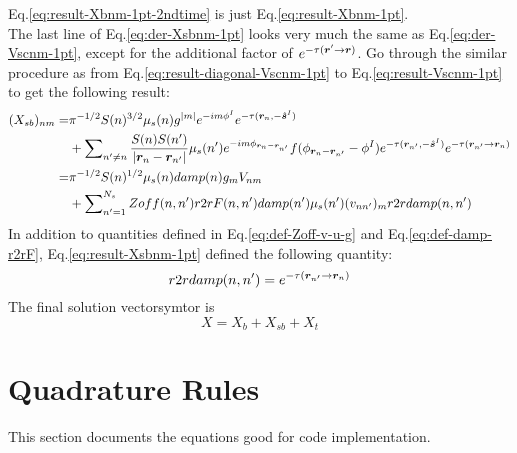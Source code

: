 \documentclass [10pt,letterpaper]{article}
\newcommand{\unitvectorsym}[1]{\hat{\vectorsym{#1}}}
\begin{document}
Eq.\eqref{eq:result-Xbnm-1pt-2ndtime} is just Eq.\eqref{eq:result-Xbnm-1pt}.
\\
The last line of Eq.\eqref{eq:der-Xsbnm-1pt} looks very much the same as Eq.\eqref{eq:der-Vscnm-1pt}, except for the additional factor of $e^{-\tau(\vectorsym{r}^\prime \to \vectorsym{r})}$. 
Go through the similar procedure as from Eq.\eqref{eq:result-diagonal-Vscnm-1pt} to Eq.\eqref{eq:result-Vscnm-1pt} to get the following result:
\begin{equation} \label{eq:result-Xsbnm-1pt}
	\begin{split} 
		(X_{sb})_{n m}
		=&
		\pi^{-1/2}
		S(n)^{3/2}
		\mu_s(n)
		g^{\lvert m \rvert}
		e^{-i m \phi^I }
		e^{-\tau(\vectorsym{r}_n,-\unitvectorsym{s}^I)} 
		\\
		&+
		\sum \nolimits_{n^\prime \neq n}
		\frac
		{S(n)S(n^\prime)}
		{\lvert \vectorsym{r}_n - \vectorsym{r}_{n^\prime} \rvert} 
		\mu_s(n^\prime)
		e^{-i m \phi_{\vectorsym{r}_n - \vectorsym{r}_{n^\prime}}}
		f(\phi_{\vectorsym{r}_n - \vectorsym{r}_{n^\prime}}-\phi^I)
		e^{-\tau(\vectorsym{r}_{n^\prime},-\unitvectorsym{s}^I)} 
		e^{-\tau(\vectorsym{r}_{n^\prime} \to \vectorsym{r}_n)} 
		\\
		=&
		\pi^{-1/2}
		S(n)^{1/2}
		\mu_s(n)
		damp(n)
		g_m
		V_{n m}
		\\
		&+
		\sum \nolimits_{n^\prime=1}^{N_s}
		Zoff(n,n^\prime)
		r2rF(n,n^\prime)
		damp(n^\prime)
		\mu_s(n^\prime)
		(v_{n n^\prime})_m
		r2rdamp(n,n^\prime)
	\end{split}
\end{equation}
In addition to quantities defined in Eq.\eqref{eq:def-Zoff-v-u-g} and Eq.\eqref{eq:def-damp-r2rF}, Eq.\eqref{eq:result-Xsbnm-1pt} defined the following quantity:
\begin{equation}
	r2rdamp(n,n^\prime)
	=
	e^{-\tau(\vectorsym{r}_{n^\prime} \to \vectorsym{r}_n)} 
\end{equation}
The final solution vectorsymtor is
\begin{equation} \label{eq:X-Xb-Xsb-Xt}
	X=X_b+X_{sb}+X_t
\end{equation}

\section{Quadrature Rules}
\label{sec:quadrature-rules}
This section documents the equations good for code implementation.
\end{document}
